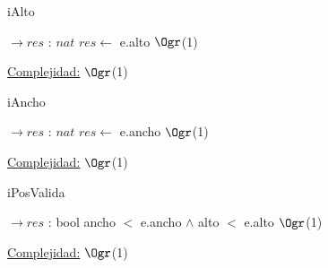 \begin{Representacion}
\begin{Algoritmos}
\begin{algorithm}[H]
	\end{algorithm}
	
	\begin{algorithm}[H]
		\caption{iAlto}
		
		\begin{algorithmic}[1]
			 $\to res$ : $nat$
			\State $res \leftarrow$ e.alto \Comment $\Ogr$(1)
			\EndProcedure
		\end{algorithmic}
		\underline{Complejidad:} $\Ogr$(1)
		
	\end{algorithm}
	
	\begin{algorithm}[H]
		\caption{iAncho}
		
		\begin{algorithmic}[1]
			 $\to res$ : $nat$
			\State $res \leftarrow$ e.ancho \Comment $\Ogr$(1)
			\EndProcedure
		\end{algorithmic}
		\underline{Complejidad:} $\Ogr$(1)
		
	\end{algorithm}
	
	\begin{algorithm}[H]
		\caption{iPosValida}
		
		\begin{algorithmic}[1]
			 $\to res$ : bool
				\State ancho $<$ e.ancho $\land$ alto $<$ e.alto \Comment $\Ogr$(1)
			\EndProcedure
		\end{algorithmic}
		\underline{Complejidad:} $\Ogr$(1)
		
	\end{algorithm}
	
\end{Algoritmos}
\end{Representacion}
